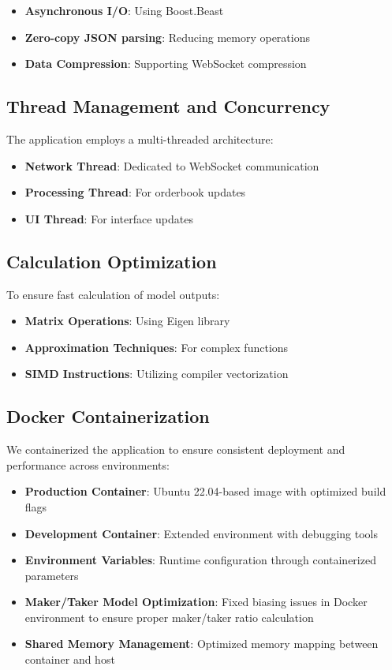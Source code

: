 \documentclass[10pt,twocolumn,a4paper]{IEEEtran}
\begin{document}
\begin{itemize}
    \item \textbf{Asynchronous I/O}: Using Boost.Beast
    \item \textbf{Zero-copy JSON parsing}: Reducing memory operations
    \item \textbf{Data Compression}: Supporting WebSocket compression
\end{itemize}

\subsection{Thread Management and Concurrency}

The application employs a multi-threaded architecture:

\begin{itemize}
    \item \textbf{Network Thread}: Dedicated to WebSocket communication
    \item \textbf{Processing Thread}: For orderbook updates
    \item \textbf{UI Thread}: For interface updates
\end{itemize}

\subsection{Calculation Optimization}

To ensure fast calculation of model outputs:

\begin{itemize}
    \item \textbf{Matrix Operations}: Using Eigen library
    \item \textbf{Approximation Techniques}: For complex functions
    \item \textbf{SIMD Instructions}: Utilizing compiler vectorization
\end{itemize}

\subsection{Docker Containerization}

We containerized the application to ensure consistent deployment and performance across environments:

\begin{itemize}
    \item \textbf{Production Container}: Ubuntu 22.04-based image with optimized build flags
    \item \textbf{Development Container}: Extended environment with debugging tools
    \item \textbf{Environment Variables}: Runtime configuration through containerized parameters
    \item \textbf{Maker/Taker Model Optimization}: Fixed biasing issues in Docker environment to ensure proper maker/taker ratio calculation
    \item \textbf{Shared Memory Management}: Optimized memory mapping between container and host
\end{itemize}
\end{document}
